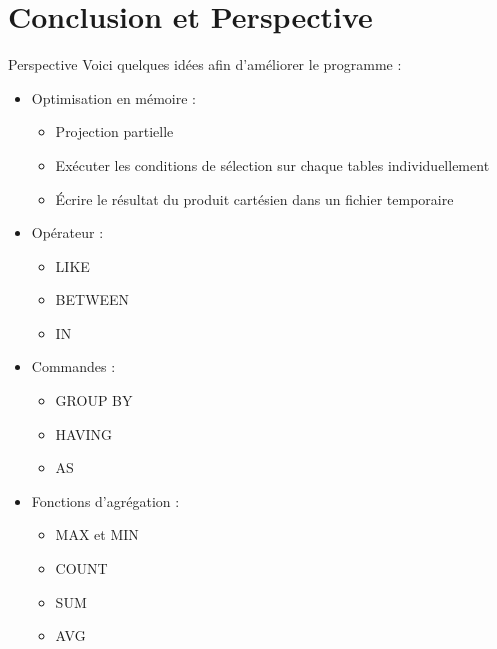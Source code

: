 \documentclass[10pt,handout]{beamer}
\begin{document}
\section{Conclusion et Perspective}

\begin{frame}{Perspective}
Voici quelques idées afin d'améliorer le programme :
\begin{itemize}
  \item Optimisation en mémoire :
  \begin{itemize}
    \item Projection partielle
    \item Exécuter les conditions de sélection sur chaque tables individuellement
    \item Écrire le résultat du produit cartésien dans un fichier temporaire
  \end{itemize}
  \item Opérateur :
  \begin{itemize}
    \item LIKE
    \item BETWEEN
    \item IN
  \end{itemize}
  \item Commandes :
  \begin{itemize}
    \item GROUP BY
    \item HAVING
    \item AS
  \end{itemize}
  \item Fonctions d’agrégation :
  \begin{itemize}
    \item MAX et MIN
    \item COUNT
    \item SUM
    \item AVG
  \end{itemize}
\end{itemize}
\end{frame}
\end{document}
